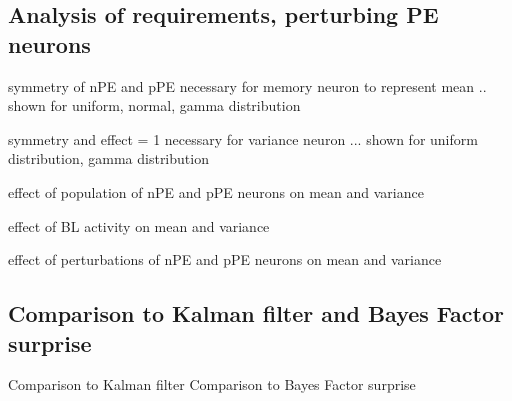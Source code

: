\documentclass[10pt,a4paper,draft]{article}
\begin{document}
\subsection*{Analysis of requirements, perturbing PE neurons}
%
symmetry of nPE and pPE necessary for memory neuron to represent mean .. shown for uniform, normal, gamma distribution

symmetry and effect = 1 necessary for variance neuron ... shown for uniform distribution, gamma distribution

effect of population of nPE and pPE neurons on mean and variance

effect of BL activity on mean and variance

effect of perturbations of nPE and pPE neurons on mean and variance


\subsection*{Comparison to Kalman filter and Bayes Factor surprise}

Comparison to Kalman filter
Comparison to Bayes Factor surprise
\end{document}
